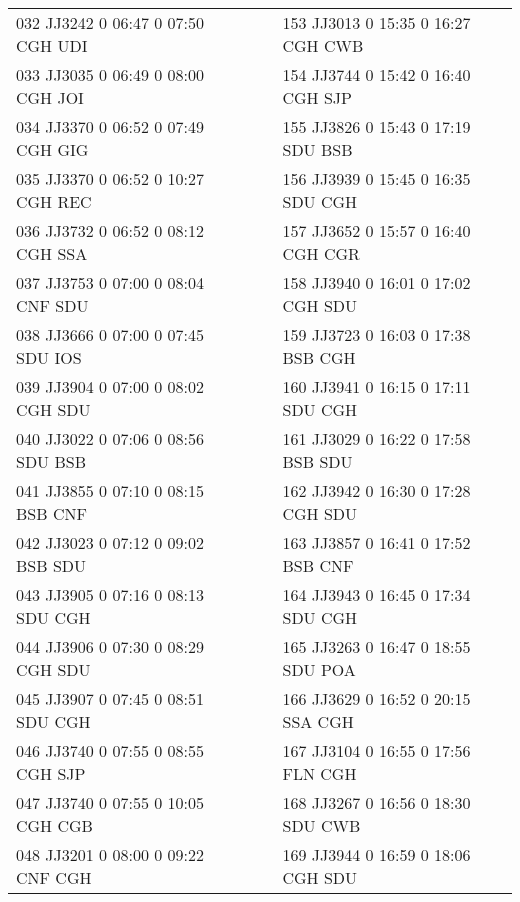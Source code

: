 \begin{scriptsize}
\begin{longtable}{l c c l}
032 JJ3242 0 06:47 0 07:50 CGH UDI & & & 153 JJ3013 0 15:35 0 16:27 CGH CWB \\

033 JJ3035 0 06:49 0 08:00 CGH JOI & & & 154 JJ3744 0 15:42 0 16:40 CGH SJP \\

034 JJ3370 0 06:52 0 07:49 CGH GIG & & & 155 JJ3826 0 15:43 0 17:19 SDU BSB \\

035 JJ3370 0 06:52 0 10:27 CGH REC & & & 156 JJ3939 0 15:45 0 16:35 SDU CGH \\

036 JJ3732 0 06:52 0 08:12 CGH SSA & & & 157 JJ3652 0 15:57 0 16:40 CGH CGR \\

037 JJ3753 0 07:00 0 08:04 CNF SDU & & & 158 JJ3940 0 16:01 0 17:02 CGH SDU \\

038 JJ3666 0 07:00 0 07:45 SDU IOS & & & 159 JJ3723 0 16:03 0 17:38 BSB CGH \\

039 JJ3904 0 07:00 0 08:02 CGH SDU & & & 160 JJ3941 0 16:15 0 17:11 SDU CGH \\

040 JJ3022 0 07:06 0 08:56 SDU BSB & & & 161 JJ3029 0 16:22 0 17:58 BSB SDU \\

041 JJ3855 0 07:10 0 08:15 BSB CNF & & & 162 JJ3942 0 16:30 0 17:28 CGH SDU \\

042 JJ3023 0 07:12 0 09:02 BSB SDU & & & 163 JJ3857 0 16:41 0 17:52 BSB CNF \\

043 JJ3905 0 07:16 0 08:13 SDU CGH & & & 164 JJ3943 0 16:45 0 17:34 SDU CGH \\

044 JJ3906 0 07:30 0 08:29 CGH SDU & & & 165 JJ3263 0 16:47 0 18:55 SDU POA \\

045 JJ3907 0 07:45 0 08:51 SDU CGH & & & 166 JJ3629 0 16:52 0 20:15 SSA CGH \\

046 JJ3740 0 07:55 0 08:55 CGH SJP & & & 167 JJ3104 0 16:55 0 17:56 FLN CGH \\

047 JJ3740 0 07:55 0 10:05 CGH CGB & & & 168 JJ3267 0 16:56 0 18:30 SDU CWB \\

048 JJ3201 0 08:00 0 09:22 CNF CGH & & & 169 JJ3944 0 16:59 0 18:06 CGH SDU \\


\end{longtable}
\end{scriptsize}

